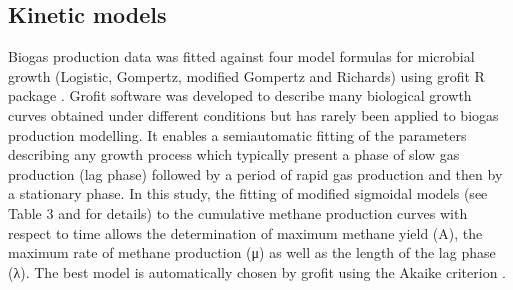 \subsection{Kinetic models}
Biogas production data was fitted against four model formulas for microbial growth (Logistic, Gompertz, modified Gompertz and Richards) using grofit R package \cite{Kahm_2010}. Grofit software was developed to describe many biological growth curves obtained under different conditions but has rarely been applied to biogas production modelling. It enables a semiautomatic fitting of the parameters describing any growth process which typically present a phase of slow gas production (lag phase) followed by a period of rapid gas production and then by a stationary phase. In this study, the fitting of modified sigmoidal models (see Table 3 and \cite{Zwietering1990} for details) to the cumulative methane production curves  with respect to time allows the determination of maximum methane yield (A), the maximum rate of methane production (μ) as well as the length of the lag phase (λ). The best model is automatically chosen by grofit using the Akaike criterion \cite{Hasenbrink_2006}.